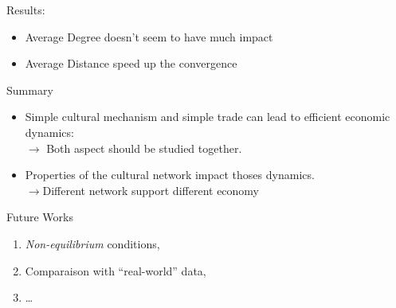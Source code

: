 \documentclass[12pt, notes=show]{beamer}
\begin{document}
	\begin{frame}{Results: }
		\begin{itemize}
				\vfill
			\item Average Degree doesn't seem to have much impact
				\vfill
			\item Average Distance speed up the convergence
		\end{itemize}

	\end{frame}



	\begin{frame}{Summary}
		\begin{itemize}
			\item Simple cultural mechanism and simple trade can lead to efficient economic dynamics:\\
				{$\rightarrow$ \small Both aspect should be studied together.}
				\vfill
			\item Properties of the cultural network impact thoses dynamics.\\
				{$\rightarrow$\small Different network support different economy}
				\vfill
		\end{itemize}

	\end{frame}
	\begin{frame}{Future Works}
		
		\begin{enumerate}
			\item \emph{Non-equilibrium} conditions,
			\item Comparaison with ``real-world'' data,
			\item \dots
		\end{enumerate}
	\end{frame}
\end{document}
